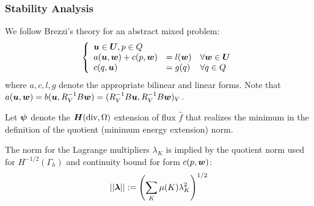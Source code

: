 \documentclass{beamer}
\begin{document}
\begin{frame}
\frametitle{Stability Analysis}
We follow Brezzi's theory for an abstract mixed problem:
\begin{equation*}
\left\{
\begin{array}{lll}
\boldsymbol u \in \boldsymbol U, p \in Q\\
a(\boldsymbol u,\boldsymbol w) + c(p,\boldsymbol w) & = l(\boldsymbol w) & \forall \boldsymbol w \in \boldsymbol U \\
c(q,\boldsymbol u) & = g(q) & \forall q \in Q
\end{array}
\right.
\end{equation*}
where $a,c,l,g$ denote the appropriate
bilinear and linear forms. Note that
$a(\boldsymbol u,\boldsymbol w)=b(\boldsymbol u,R_V^{-1}B\boldsymbol w)=(R_V^{-1}B\boldsymbol u,R_V^{-1}B\boldsymbol w)_V$.

Let $\boldsymbol\psi$ denote the $\mbox{\boldmath $H$}(\text{div},\Omega)$ extension of flux $\hat{f}$
that realizes the minimum in the definition of the quotient (minimum energy
extension) norm.

The norm for the Lagrange multipliers $\lambda_K$ is implied
by the quotient norm used for $H^{-1/2}(\Gamma_h)$ and continuity
bound for form $c(p,\boldsymbol w)$:
\[
||\boldsymbol\lambda||:=\left(\sum_K \mu(K) \lambda_K^2\right)^{1/2}
\]
\end{frame}

\end{document}
